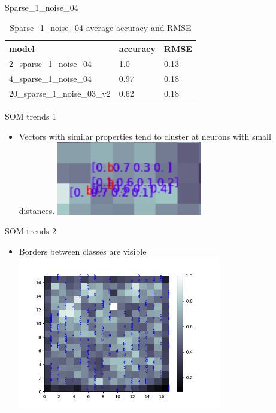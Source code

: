 \documentclass[compress]{beamer}
\begin{document}
	\subsection{ } %
	\begin{frame}{Sparse\_1\_noise\_04}
		\begin{table}[!htb]
			\centering
			\caption{Sparse\_1\_noise\_04 average accuracy and RMSE}
			\begin{tabularx}{\textwidth}{ p{5cm}  X  X }
				\hline
				model & accuracy & RMSE \\ 
				\hline
				2\_sparse\_1\_noise\_04 & 1.0 & 0.13\\
				4\_sparse\_1\_noise\_04 & 0.97 & 0.18\\
				20\_sparse\_1\_noise\_03\_v2 & 0.62 & 0.18\\
				\hline
			\end{tabularx}
			\label{table:sparse1_noise_04}
		\end{table}
	\end{frame}
	\begin{frame}{SOM trends 1}
		\begin{itemize}
			\item Vectors with similar properties tend to cluster at neurons with small distances. \includegraphics[width=0.5\textwidth]{images/SOM_similar_vector_cluster.png}
		\end{itemize}
	\end{frame}
	\begin{frame}{SOM trends 2}
		\begin{itemize}
			\item Borders between classes are visible \\
			\includegraphics[width=0.7\textwidth]{images/SOM_naked.png}
		\end{itemize}
	\end{frame}
\end{document}
